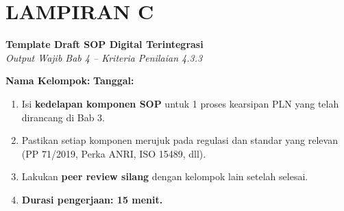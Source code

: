 \documentclass[12pt,a4paper]{report}
\newcommand{\fillline}[1][6cm]{\underline{\hspace{#1}}}
\begin{document}
\section*{\color{plnblue} LAMPIRAN C}
{\Large\bfseries Template Draft SOP Digital Terintegrasi}\\[0.15cm]
{\normalsize\color{medgray}\textit{Output Wajib Bab 4 -- Kriteria Penilaian 4.3.3}}

\vspace{0.4cm}

\noindent\textbf{Nama Kelompok:} \fillline \quad \textbf{Tanggal:} \fillline[3cm]

\begin{instruksibox}
\begin{enumerate}
    \item Isi \textbf{kedelapan komponen SOP} untuk 1 proses kearsipan PLN yang telah dirancang di Bab 3.
    \item Pastikan setiap komponen merujuk pada regulasi dan standar yang relevan (PP 71/2019, Perka ANRI, ISO 15489, dll).
    \item Lakukan \textbf{peer review silang} dengan kelompok lain setelah selesai.
    \item \textbf{Durasi pengerjaan: 15 menit.}
\end{enumerate}
\end{instruksibox}

\vspace{0.4cm}

\begin{tcolorbox}[colback=plnblue!3, colframe=plnblue!60, sharp corners, title={\small\bfseries Komponen 1: Tujuan \& Ruang Lingkup}, boxrule=0.8pt]
\vspace{2.0cm}
\end{tcolorbox}

\vspace{0.2cm}

\begin{tcolorbox}[colback=plnblue!3, colframe=plnblue!60, sharp corners, title={\small\bfseries Komponen 2: Definisi \& Akronim}, boxrule=0.8pt]
\vspace{2.0cm}
\end{tcolorbox}

\vspace{0.2cm}
\end{document}
